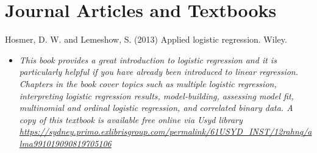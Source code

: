 \documentclass[
]{book}
\providecommand{\tightlist}{%
  \setlength{\itemsep}{0pt}\setlength{\parskip}{0pt}}
\begin{document}
\section{Journal Articles and Textbooks}\label{journal-articles-and-textbooks-6}

Hosmer, D. W. and Lemeshow, S. (2013) Applied logistic regression. Wiley.

\begin{itemize}
\tightlist
\item
  \emph{This book provides a great introduction to logistic regression and it is particularly helpful if you have already been introduced to linear regression. Chapters in the book cover topics such as multiple logistic regression, interpreting logistic regression results, model-building, assessing model fit, multinomial and ordinal logistic regression, and correlated binary data. A copy of this textbook is available free online via Usyd library \url{https://sydney.primo.exlibrisgroup.com/permalink/61USYD_INST/12rahnq/alma991019090819705106} }
\end{itemize}

  
\end{document}
